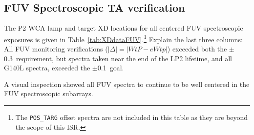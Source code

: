 \subsection{FUV Spectroscopic TA verification}\label{subsec:FspVER}
The P2 WCA lamp and target XD locations for all centered FUV spectroscopic exposures is given in Table~\ref{tab:XDdataFUV}.\footnote{The \texttt{POS\_TARG} offset spectra are not included in this table as
they are beyond the scope of this ISR.}
Explain the last three columns:
All FUV monitoring verifications ($|\Delta| = |WtP-eWtp|$) exceeded both the $\pm$0.3\arcsec\ requirement,
but spectra taken near the end of the LP2 lifetime, and all G140L spectra, exceeded the $\pm$0.1\arcsec\ goal.

A visual inspection showed all FUV spectra to continue to be well centered in the FUV spectroscopic subarrays.
